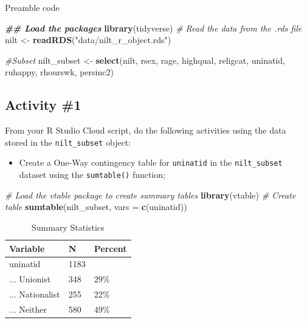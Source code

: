 \documentclass[
]{book}
\newenvironment{Shaded}{\begin{snugshade}}{\end{snugshade}}
\newcommand{\AttributeTok}[1]{\textcolor[rgb]{0.13,0.29,0.53}{#1}}
\newcommand{\CommentTok}[1]{\textcolor[rgb]{0.56,0.35,0.01}{\textit{#1}}}
\newcommand{\DocumentationTok}[1]{\textcolor[rgb]{0.56,0.35,0.01}{\textbf{\textit{#1}}}}
\newcommand{\FunctionTok}[1]{\textcolor[rgb]{0.13,0.29,0.53}{\textbf{#1}}}
\newcommand{\NormalTok}[1]{#1}
\newcommand{\OtherTok}[1]{\textcolor[rgb]{0.56,0.35,0.01}{#1}}
\newcommand{\StringTok}[1]{\textcolor[rgb]{0.31,0.60,0.02}{#1}}
\providecommand{\tightlist}{%
  \setlength{\itemsep}{0pt}\setlength{\parskip}{0pt}}
\begin{document}
Preamble code

\begin{Shaded}
\begin{Highlighting}[]
\DocumentationTok{\#\# Load the packages}
\FunctionTok{library}\NormalTok{(tidyverse)}
\CommentTok{\# Read the data from the .rds file}
\NormalTok{nilt }\OtherTok{\textless{}{-}} \FunctionTok{readRDS}\NormalTok{(}\StringTok{"data/nilt\_r\_object.rds"}\NormalTok{)}
\end{Highlighting}
\end{Shaded}

\begin{Shaded}
\begin{Highlighting}[]
\CommentTok{\#Subset}
\NormalTok{nilt\_subset }\OtherTok{\textless{}{-}} \FunctionTok{select}\NormalTok{(nilt, rsex, rage, highqual, religcat, uninatid,  ruhappy, rhourswk, persinc2)}
\end{Highlighting}
\end{Shaded}

\hypertarget{activity-1-4}{%
\subsection{Activity \#1}\label{activity-1-4}}

From your R Studio Cloud script, do the following activities using the data stored in the \texttt{nilt\_subset} object:

\begin{itemize}
\tightlist
\item
  Create a One-Way contingency table for \texttt{uninatid} in the \texttt{nilt\_subset} dataset using the \texttt{sumtable()} function;
\end{itemize}

\begin{Shaded}
\begin{Highlighting}[]
\CommentTok{\# Load the vtable package to create summary tables}
\FunctionTok{library}\NormalTok{(vtable)}
\CommentTok{\# Create table}
\FunctionTok{sumtable}\NormalTok{(nilt\_subset, }\AttributeTok{vars =} \FunctionTok{c}\NormalTok{(}\StringTok{\textquotesingle{}uninatid\textquotesingle{}}\NormalTok{))}
\end{Highlighting}
\end{Shaded}

\begin{table}

\caption{\label{tab:unnamed-chunk-120}Summary Statistics}
\centering
\begin{tabular}[t]{lll}
\toprule
Variable & N & Percent\\
\midrule
uninatid & 1183 & \\
... Unionist & 348 & 29\%\\
... Nationalist & 255 & 22\%\\
... Neither & 580 & 49\%\\
\bottomrule
\end{tabular}
\end{table}
\end{document}
